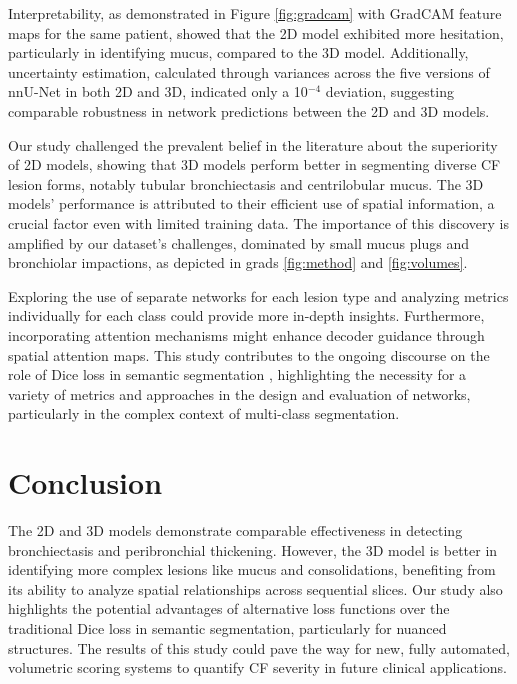 \documentclass{article}
\begin{document}
Interpretability, as demonstrated in Figure \ref{fig:gradcam} with GradCAM feature maps for the same patient, showed that the 2D model exhibited more hesitation, particularly in identifying mucus, compared to the 3D model. Additionally, uncertainty estimation, calculated through variances across the five versions of nnU-Net in both 2D and 3D, indicated only a 10$^{-4}$ deviation, suggesting comparable robustness in network predictions between the 2D and 3D models.

Our study challenged the prevalent belief in the literature \cite{R16} about the superiority of 2D models, showing that 3D models perform better in segmenting diverse CF lesion forms, notably tubular bronchiectasis and centrilobular mucus. The 3D models' performance is attributed to their efficient use of spatial information, a crucial factor even with limited training data. The importance of this discovery is amplified by our dataset's challenges, dominated by small mucus plugs and bronchiolar impactions, as depicted in grads \ref{fig:method} and \ref{fig:volumes}.

Exploring the use of separate networks for each lesion type and analyzing metrics individually for each class \cite{R14} could provide more in-depth insights. Furthermore, incorporating attention mechanisms \cite{R17} might enhance decoder guidance through spatial attention maps. This study contributes to the ongoing discourse on the role of Dice loss in semantic segmentation \cite{R15}, highlighting the necessity for a variety of metrics and approaches in the design and evaluation of networks, particularly in the complex context of multi-class segmentation.

\section{Conclusion}
\label{sec:conclusion}
The 2D and 3D models demonstrate comparable effectiveness in detecting bronchiectasis and peribronchial thickening. However, the 3D model is better in identifying more complex lesions like mucus and consolidations, benefiting from its ability to analyze spatial relationships across sequential slices. Our study also highlights the potential advantages of alternative loss functions over the traditional Dice loss in semantic segmentation, particularly for nuanced structures. The results of this study could pave the way for new, fully automated, volumetric scoring systems to quantify CF severity in future clinical applications.
\end{document}
